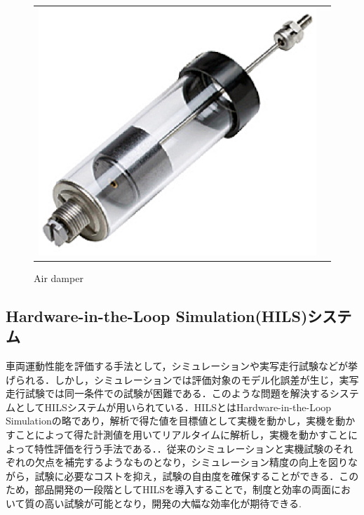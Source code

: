 \documentclass[a4paper,12pt]{article_vdlab_sotsuron}
\begin{document}
\vspace{10mm}
 \begin{figure}[h!]
   \begin{tabular}{cc}
     \begin{minipage}{1.0\hsize}
       \begin{center}
 	\includegraphics[scale = 0.8]{figure/airpot_1.eps}
 	\caption{Air damper\cite{picture_airpot}}
 	\label{fig:suspension}
       \end{center}
      \end{minipage}
     \end{tabular}
 \end{figure}

\newpage
\subsection{Hardware-in-the-Loop Simulation(HILS)システム}
車両運動性能を評価する手法として，シミュレーションや実写走行試験などが挙げられる．しかし，シミュレーションでは評価対象のモデル化誤差が生じ，実写走行試験では同一条件での試験が困難である．このような問題を解決するシステムとしてHILSシステムが用いられている\cite{exp_hils1}．HILSとはHardware-in-the-Loop Simulationの略であり，解析で得た値を目標値として実機を動かし，実機を動かすことによって得た計測値を用いてリアルタイムに解析し，実機を動かすことによって特性評価を行う手法である．．従来のシミュレーションと実機試験のそれぞれの欠点を補完するようなものとなり，シミュレーション精度の向上を図りながら，試験に必要なコストを抑え，試験の自由度を確保することができる．このため，部品開発の一段階としてHILSを導入することで，制度と効率の両面において質の高い試験が可能となり，開発の大幅な効率化が期待できる\cite{exp_hils2}.
\end{document}
